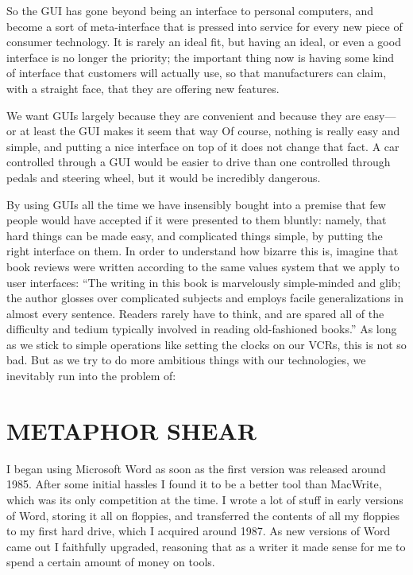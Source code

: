 \documentclass[
  fontsize=11pt,
  paper=landscape,
  twocolumn=true,
  pagesize=pdftex,
  headings=small,
  DIV=15,
  ]{scrartcl}
\begin{document}
So the GUI has gone beyond being an interface to personal computers, and
become a sort of meta-interface that is pressed into service for every
new piece of consumer technology. It is rarely an ideal fit, but having
an ideal, or even a good interface is no longer the priority; the
important thing now is having some kind of interface that customers will
actually use, so that manufacturers can claim, with a straight face,
that they are offering new features.

We want GUIs largely because they are convenient and because they are
easy--- or at least the GUI makes it seem that way Of course, nothing is
really easy and simple, and putting a nice interface on top of it does
not change that fact. A car controlled through a GUI would be easier to
drive than one controlled through pedals and steering wheel, but it
would be incredibly dangerous.

By using GUIs all the time we have insensibly bought into a premise that
few people would have accepted if it were presented to them bluntly:
namely, that hard things can be made easy, and complicated things
simple, by putting the right interface on them. In order to understand
how bizarre this is, imagine that book reviews were written according to
the same values system that we apply to user interfaces: ``The writing
in this book is marvelously simple-minded and glib; the author glosses
over complicated subjects and employs facile generalizations in almost
every sentence. Readers rarely have to think, and are spared all of the
difficulty and tedium typically involved in reading old-fashioned
books.'' As long as we stick to simple operations like setting the
clocks on our VCRs, this is not so bad. But as we try to do more
ambitious things with our technologies, we inevitably run into the
problem of:

\section{METAPHOR SHEAR}

I began using Microsoft Word as soon as the first version was released
around 1985. After some initial hassles I found it to be a better tool
than MacWrite, which was its only competition at the time. I wrote a lot
of stuff in early versions of Word, storing it all on floppies, and
transferred the contents of all my floppies to my first hard drive,
which I acquired around 1987. As new versions of Word came out I
faithfully upgraded, reasoning that as a writer it made sense for me to
spend a certain amount of money on tools.
\end{document}
